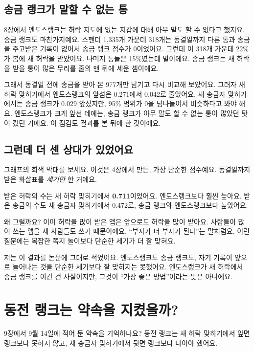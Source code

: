 \subsection*{송금 랭크가 말할 수 없는 통}

8장에서 엔도스랭크는 허락 지도에 없는 지갑에 대해 아무 말도 할 수 없다고 했지요.
송금 랭크도 마찬가지예요.
스펜더 1,335개 가운데 318개는 동결일까지 다른 통과 송금을 주고받은 기록이 없어서 송금 랭크 점수가 0이었어요.
그런데 이 318개 가운데 22\%가 봄에 새 허락을 받았어요.
나머지 통들은 15\%였는데 말이에요.
송금 랭크는 새 허락을 받을 통이 많은 무리를 줄의 맨 뒤에 세운 셈이에요.

그래서 동결일 전에 송금을 받아 본 977개만 남기고 다시 비교해 보았어요.
그러자 새 허락 맞히기에서 엔도스랭크의 앞섬은 0.271에서 0.042로 줄었어요.
새 송금자 맞히기에서는 송금 랭크가 0.029 앞섰지만, 95\% 범위가 0을 넘나들어서 비슷하다고 봐야 해요.
엔도스랭크가 크게 앞선 데에는, 송금 랭크가 아무 말도 할 수 없는 통이 많았던 탓이 컸던 거예요.
이 점검도 결과를 본 뒤에 한 것이에요.

\subsection*{그런데 더 센 상대가 있었어요}

그래프의 회색 막대를 보세요.
이것은 4장에서 만든, 가장 단순한 점수예요.
동결일까지 받은 화살표를 \emph{세기만} 한 거예요.

받은 허락의 수는 새 허락 맞히기에서 \textbf{0.711}이었어요.
엔도스랭크보다 훨씬 높아요.
받은 송금의 수도 새 송금자 맞히기에서 0.472로, 송금 랭크와 엔도스랭크보다 높았어요.

왜 그럴까요?
이미 허락을 많이 받은 앱은 앞으로도 허락을 많이 받아요.
사람들이 많이 쓰는 앱을 새 사람들도 쓰기 때문이에요.
“부자가 더 부자가 된다”는 말처럼요.
이런 질문에는 복잡한 쪽지 놀이보다 단순한 세기가 더 잘 맞혀요.

저는 이 결과를 논문에 그대로 적었어요.
엔도스랭크도 송금 랭크도, 자기 기록이 앞으로 늘어나는 것을 단순한 세기보다 잘 맞히지는 못했어요.
엔도스랭크가 새 허락에서 송금 랭크를 이긴 건 사실이지만, 그것이 “가장 좋은 방법”이라는 뜻은 아니에요.

\section{동전 랭크는 약속을 지켰을까?}

9장에서 9월 14일에 적어 둔 약속을 기억하나요?
동전 랭크는 새 허락 맞히기에서 앞면 랭크보다 못하지 않고, 새 송금자 맞히기에서 뒷면 랭크보다 나아야 했어요.

